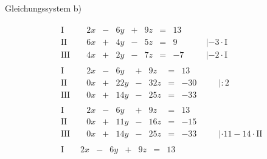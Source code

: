 \begin{exercise}
\begin{minipage}{0.49\linewidth}
    \end{minipage}%
    \endgroup
    \par Gleichungssystem b)\par
    \begingroup
    \setlength{\arraycolsep}{1pt}%
    \begin{minipage}{0.49\linewidth}
    \vspace*{-\abovedisplayskip}
    \begin{align*}
    &
    \begin{array}{r|rrrrrrrrrl}
      \text{I}{\,} & {\,} & \num{2}x & - & \num{6}y & + & \num{9}z & = & \num{13} & {\quad} &                        \\
     \text{II}{\,} & {\,} & \num{6}x & + & \num{4}y & - & \num{5}z & = &  \num{9} & {\quad} & |-\num{3}\cdot\text{I} \\
    \text{III}{\,} & {\,} & \num{4}x & + & \num{2}y & - & \num{7}z & = & -\num{7} & {\quad} & |-\num{2}\cdot\text{I}
    \end{array}
    \\[1ex]&
    \begin{array}{r|rrrrrrrrrl}
      \text{I}{\,} & {\,} & \num{2}x & - &  \num{6}y & + &  \num{9}z & = &  \num{13} & {\quad} &           \\
     \text{II}{\,} & {\,} & \num{0}x & + & \num{22}y & - & \num{32}z & = & -\num{30} & {\quad} & |:\num{2} \\
    \text{III}{\,} & {\,} & \num{0}x & + & \num{14}y & - & \num{25}z & = & -\num{33} & {\quad} &
    \end{array}
    \\[1ex]&
    \begin{array}{r|rrrrrrrrrl}
      \text{I}{\,} & {\,} & \num{2}x & - &  \num{6}y & + &  \num{9}z & = &  \num{13} & {\quad} &                                       \\
     \text{II}{\,} & {\,} & \num{0}x & + & \num{11}y & - & \num{16}z & = & -\num{15} & {\quad} &                                       \\
    \text{III}{\,} & {\,} & \num{0}x & + & \num{14}y & - & \num{25}z & = & -\num{33} & {\quad} & |\cdot\num{11}-\num{14}\cdot\text{II}
    \end{array}
    \\[1ex]&
    \begin{array}{r|rrrrrrrrrl}
      \text{I}{\,} & {\,} & \num{2}x & - &  \num{6}y & + &  \num{9}z & = &   \num{13} & {\quad} &                          \\

\end{array}
\end{align*}
\end{minipage}
\end{exercise}
